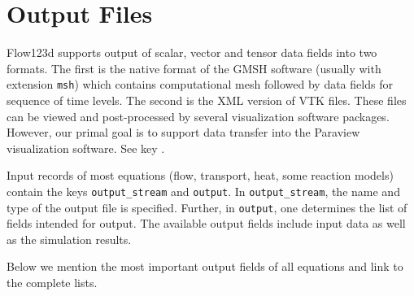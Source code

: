 %
%
%
%

\section{Output Files}
\label{section_output}

Flow123d supports output of scalar, vector and tensor data fields into two formats. The first is the native format of the GMSH software (usually with extension \verb'msh')
which contains computational mesh followed by data fields for sequence of time levels. The second is the XML version of VTK files. These files can be 
viewed and post-processed by several visualization software packages. However, our primal goal is to support data transfer into the Paraview visualization software.
See key .

Input records of most equations (flow, transport, heat, some reaction models) contain the keys {\tt output\_stream} and {\tt output}.
In {\tt output\_stream}, the name and type of the output file is specified.
Further, in {\tt output}, one determines the list of fields intended for output.
The available output fields include input data as well as the simulation results.

Below we mention the most important output fields of all equations and link to the complete lists.

